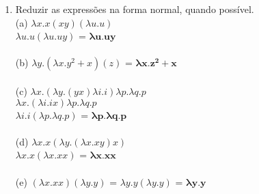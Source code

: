 \documentclass{article}
\begin{document}
\begin{enumerate}
    \item Reduzir as expressões na forma normal, quando possível. \\
    (a) $\lambda x.x(xy)(\lambda u.u)$ \\
        $\lambda u.u(\lambda u.uy)$ = $\mathbf{\lambda u.uy}$ \\ \\
    (b) $\lambda y.(\lambda x.y^{2}+x)(z)$ = $\mathbf{\lambda x.z^{2}+x}$ \\ \\
    (c) $\lambda x.(\lambda y.(yx)\lambda i.i)\lambda p.\lambda q.p$ \\
        $\lambda x. (\lambda i.ix)\lambda p.\lambda q.p$ \\
        $\lambda i.i(\lambda p.\lambda q.p)$  = $\mathbf{\lambda p.\lambda q.p}$ \\ \\
    (d) $\lambda x.x(\lambda y.(\lambda x.xy)x)$ \\
        $\lambda x.x(\lambda x.xx)$ = $\mathbf{\lambda x.xx}$ \\ \\
    (e) $(\lambda x.xx)(\lambda y.y)$  = $\lambda y.y(\lambda y.y)$ = $\mathbf{\lambda y.y}$
\end{enumerate}
\end{document}
